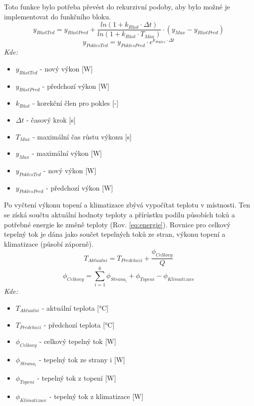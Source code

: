 \noindent Toto funkce bylo potřeba převést do rekurzivní podoby, aby bylo možné je implementovat do funkčního bloku.
\begin{equation}
    y_{RůstTed} = y_{RůstPred} + \frac{ln(1 + k_{Růst} \cdot \Delta t)}{ln(1 + k_{Růst} \cdot T_{Max})} \cdot (y_{Max} - y_{RůstPred}) 
    \label{eq:rust_rekurzivni}
\end{equation}
\begin{equation}
    y_{PoklesTed} = y_{PoklesPred} \cdot e^{k_{Pokles} \cdot \Delta t}
    \label{eq:pokles_rekurzivni}
\end{equation}
\noindent\textit{Kde:}
\begin{itemize}
    \item $y_{RůstTed}$ - nový výkon [W]
    \item $y_{RůstPred}$ - předchozí výkon [W]
    \item $k_{Růst}$ - korekční člen pro pokles [-]
    \item $\Delta t$ - časový krok [s]
    \item $T_{Max}$ - maximální čas růstu výkonu [s]
    \item $y_{Max}$ - maximální výkon [W]
    \item $y_{PoklesTed}$ - nový výkon [W]
    \item $y_{PoklesPred}$ - předchozí výkon [W] \newline
\end{itemize}
\noindent Po vyčtení výkonu topení a klimatizace zbývá vypočítat teplotu v místnosti. Ten se získá součtu aktuální hodnoty teploty a přírůstku podílu působích toků a potřebné energie ke změně teploty (Rov. \ref{eq:energie}). Rovnice pro celkový tepelný tok je dána jako součet tepelných toků ze stran, výkonu topení a klimatizace (působí záporně).
\begin{equation}
    T_{Aktualni} = T_{Predchozi} + \frac{\phi _{Celkovy}}{Q}
    \label{eq:aktualni_teplota}
\end{equation}
\begin{equation}
    \phi _{Celkovy} = \sum_{i=1}^{6} \phi _{Strana_i} + \phi _{Topeni} - \phi _{Klimatizace}
    \label{eq:celkovy_tepelny_tok}
\end{equation}
\noindent\textit{Kde:}
\begin{itemize}
    \item $T_{Aktualni}$ - aktuální teplota [°C]
    \item $T_{Predchozi}$ - předchozí teplota [°C]
    \item $\phi _{Celkovy}$ - celkový tepelný tok [W]
    \item $\phi _{Strana_i}$ - tepelný tok ze strany i [W]
    \item $\phi _{Topeni}$ - tepelný tok z topení [W]
    \item $\phi _{Klimatizace}$ - tepelný tok z klimatizace [W] \newline
\end{itemize}

